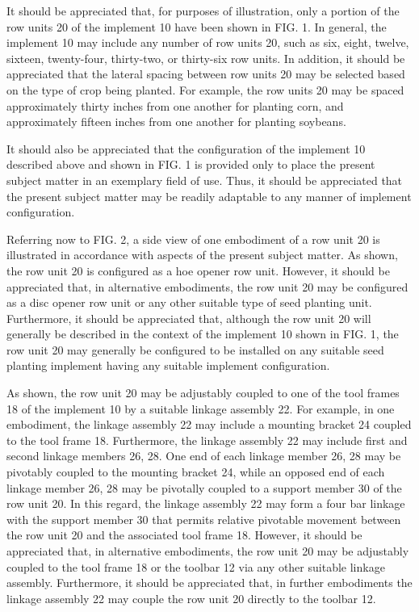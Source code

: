 \documentclass[11pt,a4paper]{article}
\begin{document}
It should be appreciated that, for purposes of illustration, only a portion of the row units 20 of the implement 10 have been shown in FIG. 1. In general, the implement 10 may include any number of row units 20, such as six, eight, twelve, sixteen, twenty-four, thirty-two, or thirty-six row units. In addition, it should be appreciated that the lateral spacing between row units 20 may be selected based on the type of crop being planted. For example, the row units 20 may be spaced approximately thirty inches from one another for planting corn, and approximately fifteen inches from one another for planting soybeans.

It should also be appreciated that the configuration of the implement 10 described above and shown in FIG. 1 is provided only to place the present subject matter in an exemplary field of use. Thus, it should be appreciated that the present subject matter may be readily adaptable to any manner of implement configuration.

Referring now to FIG. 2, a side view of one embodiment of a row unit 20 is illustrated in accordance with aspects of the present subject matter. As shown, the row unit 20 is configured as a hoe opener row unit. However, it should be appreciated that, in alternative embodiments, the row unit 20 may be configured as a disc opener row unit or any other suitable type of seed planting unit. Furthermore, it should be appreciated that, although the row unit 20 will generally be described in the context of the implement 10 shown in FIG. 1, the row unit 20 may generally be configured to be installed on any suitable seed planting implement having any suitable implement configuration.

As shown, the row unit 20 may be adjustably coupled to one of the tool frames 18 of the implement 10 by a suitable linkage assembly 22. For example, in one embodiment, the linkage assembly 22 may include a mounting bracket 24 coupled to the tool frame 18. Furthermore, the linkage assembly 22 may include first and second linkage members 26, 28. One end of each linkage member 26, 28 may be pivotably coupled to the mounting bracket 24, while an opposed end of each linkage member 26, 28 may be pivotally coupled to a support member 30 of the row unit 20. In this regard, the linkage assembly 22 may form a four bar linkage with the support member 30 that permits relative pivotable movement between the row unit 20 and the associated tool frame 18. However, it should be appreciated that, in alternative embodiments, the row unit 20 may be adjustably coupled to the tool frame 18 or the toolbar 12 via any other suitable linkage assembly. Furthermore, it should be appreciated that, in further embodiments the linkage assembly 22 may couple the row unit 20 directly to the toolbar 12.
\end{document}
